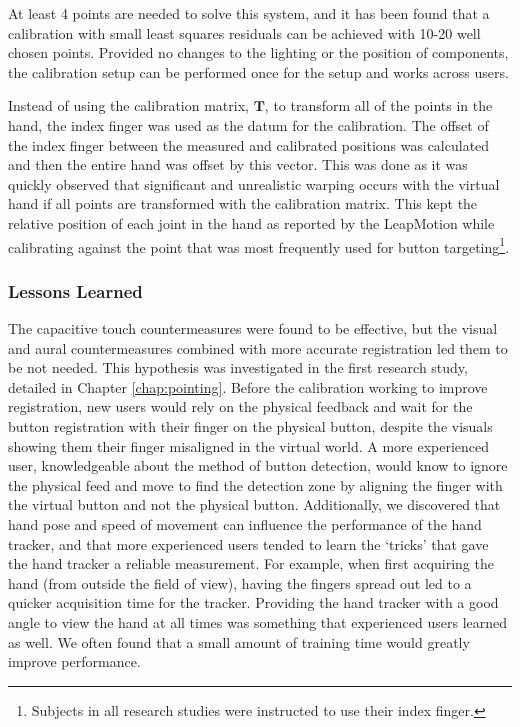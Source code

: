At least 4 points are needed to solve this system, and it has been found that a calibration with small least squares residuals can be achieved with 10-20 well chosen points.
Provided no changes to the lighting or the position of components, the calibration setup can be performed once for the setup and works across users.

Instead of using the calibration matrix, $\mathbf{T}$, to transform all of the points in the hand, the index finger was used as the datum for the calibration.
The offset of the index finger between the measured and calibrated positions was calculated and then the entire hand was offset by this vector.
This was done as it was quickly observed that significant and unrealistic warping occurs with the virtual hand if all points are transformed with the calibration matrix.
This kept the relative position of each joint in the hand as reported by the LeapMotion while calibrating against the point that was most frequently used for button targeting\footnote{Subjects in all research studies were instructed to use their index finger.}.

\subsubsection{Lessons Learned}

The capacitive touch countermeasures were found to be effective, but the visual and aural countermeasures combined with more accurate registration led them to be not needed.
This hypothesis was investigated in the first research study, detailed in Chapter \ref{chap:pointing}.
Before the calibration working to improve registration, new users would rely on the physical feedback and wait for the button registration with their finger on the physical button, despite the visuals showing them their finger misaligned in the virtual world.
A more experienced user, knowledgeable about the method of button detection, would know to ignore the physical feed and move to find the detection zone by aligning the finger with the virtual button and not the physical button.
Additionally, we discovered that hand pose and speed of movement can influence the performance of the hand tracker, and that more experienced users tended to learn the `tricks' that gave the hand tracker a reliable measurement.
For example, when first acquiring the hand (from outside the field of view), having the fingers spread out led to a quicker acquisition time for the tracker.
Providing the hand tracker with a good angle to view the hand at all times was something that experienced users learned as well.
We often found that a small amount of training time would greatly improve performance.

